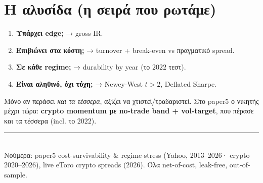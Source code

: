 \documentclass[11pt]{article}
\begin{document}
\section{Η αλυσίδα (η σειρά που ρωτάμε)}
\begin{enumerate}[leftmargin=1.5em]
\item \textbf{Υπάρχει edge;} → gross IR.
\item \textbf{Επιβιώνει στα κόστη;} → turnover + break-even vs πραγματικό spread.
\item \textbf{Σε κάθε regime;} → durability by year (το $2022$ τεστ).
\item \textbf{Είναι αληθινό, όχι τύχη;} → Newey-West $t>2$, Deflated Sharpe.
\end{enumerate}
Μόνο αν περάσει \emph{και τα τέσσερα}, αξίζει να χτιστεί/τραδαριστεί. Στο paper5 ο νικητής μέχρι τώρα:
\textbf{crypto momentum με no-trade band + vol-target}, που πέρασε και τα τέσσερα (incl. το $2022$).

\vfill
\noindent\rule{\linewidth}{0.4pt}\\[2pt]
\footnotesize Νούμερα: paper5 cost-survivability \& regime-stress (Yahoo, 2013--2026· crypto 2020--2026),
live eToro crypto spreads (2026). Όλα net-of-cost, leak-free, out-of-sample.
\end{document}
